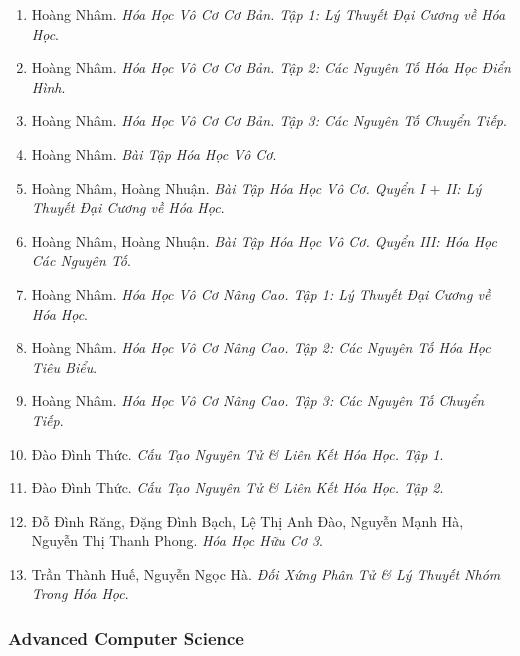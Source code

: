 \documentclass{article}
\begin{document}
\begin{enumerate}
	\item Hoàng Nhâm. {\it Hóa Học Vô Cơ Cơ Bản. Tập 1: Lý Thuyết Đại Cương về Hóa Học}.
	\item Hoàng Nhâm. {\it Hóa Học Vô Cơ Cơ Bản. Tập 2: Các Nguyên Tố Hóa Học Điển Hình}.
	\item Hoàng Nhâm. {\it Hóa Học Vô Cơ Cơ Bản. Tập 3: Các Nguyên Tố Chuyển Tiếp}.
	\item Hoàng Nhâm. {\it Bài Tập Hóa Học Vô Cơ}.
	\item Hoàng Nhâm, Hoàng Nhuận. {\it Bài Tập Hóa Học Vô Cơ. Quyển I $+$ II: Lý Thuyết Đại Cương về Hóa Học}.
	\item Hoàng Nhâm, Hoàng Nhuận. {\it Bài Tập Hóa Học Vô Cơ. Quyển III: Hóa Học Các Nguyên Tố}.
	\item Hoàng Nhâm. {\it Hóa Học Vô Cơ Nâng Cao. Tập 1: Lý Thuyết Đại Cương về Hóa Học}.
	\item Hoàng Nhâm. {\it Hóa Học Vô Cơ Nâng Cao. Tập 2: Các Nguyên Tố Hóa Học Tiêu Biểu}.
	\item Hoàng Nhâm. {\it Hóa Học Vô Cơ Nâng Cao. Tập 3: Các Nguyên Tố Chuyển Tiếp}.
	\item Đào Đình Thức. {\it Cấu Tạo Nguyên Tử \& Liên Kết Hóa Học. Tập 1}.
	\item Đào Đình Thức. {\it Cấu Tạo Nguyên Tử \& Liên Kết Hóa Học. Tập 2}.
	\item Đỗ Đình Răng, Đặng Đình Bạch, Lệ Thị Anh Đào, Nguyễn Mạnh Hà, Nguyễn Thị Thanh Phong. {\it Hóa Học Hữu Cơ 3}.
	\item Trần Thành Huế, Nguyễn Ngọc Hà. {\it Đối Xứng Phân Tử \& Lý Thuyết Nhóm Trong Hóa Học}.
\end{enumerate}


\subsubsection{Advanced Computer Science}
\end{document}
